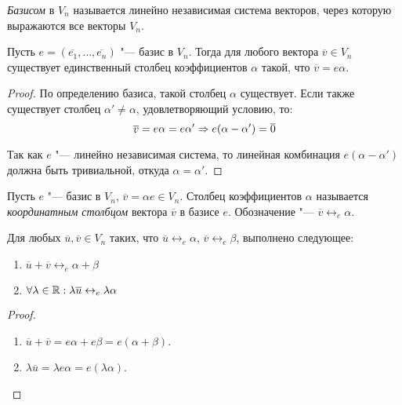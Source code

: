     \begin{definition}
    	\textit{Базисом} в $V_n$ называется линейно независимая система векторов, через которую выражаются все векторы $V_n$.
    \end{definition}
    
    \begin{proposition}
    	Пусть $e = (\overline{e_1}, \dots, \overline{e_n})$ "--- базис в $V_n$. Тогда для любого вектора $\overline v \in V_n$ существует единственный столбец коэффициентов $\alpha$ такой, что $\overline{v} = e\alpha$.
    \end{proposition}
    
    \begin{proof}
    	По определению базиса, такой столбец $\alpha$ существует. Если также существует столбец $\alpha' \ne \alpha$, удовлетворяющий условию, то:
    	\[\overline{v} = e\alpha = e\alpha' \Rightarrow
    	e(\alpha - \alpha') = \overline{0}\]
    	
    	Так как $e$ "--- линейно независимая система, то линейная комбинация $e(\alpha - \alpha')$ должна быть тривиальной, откуда $\alpha = \alpha'$.
    \end{proof}
    
    \begin{definition}
    	Пусть $e$ "--- базис в $V_n$, $\overline{v} = \alpha e \in V_n$. Столбец коэффициентов $\alpha$ называется \textit{координатным столбцом} вектора $\overline{v}$ в базисе $e$. Обозначение "--- $\overline{v} \leftrightarrow_e \alpha$.
    \end{definition}
    
    \begin{proposition}
    	Для любых $\overline u, \overline v \in V_n$ таких, что $\overline u \leftrightarrow_e \alpha$, $\overline v \leftrightarrow_e \beta$, выполнено следующее:
    	\begin{enumerate}
    		\item $\overline u + \overline v \leftrightarrow_e \alpha + \beta$
    		\item $\forall \lambda \in \mathbb{R}: \lambda \overline u \leftrightarrow_e \lambda\alpha$
    	\end{enumerate}
    \end{proposition}
    
    \begin{proof}~
    	\begin{enumerate}
    		\item $\overline{u} + \overline{v} = e\alpha + e\beta = e(\alpha + \beta)$.
    		\item $\lambda\overline{u} = \lambda e\alpha = e(\lambda \alpha)$.\qedhere
    	\end{enumerate}
    \end{proof}
    
